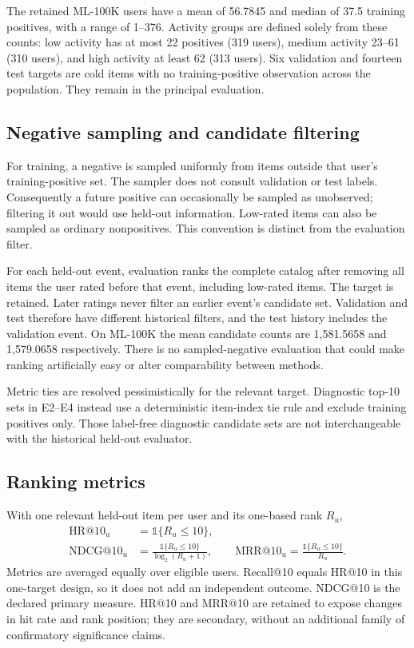 The retained ML-100K users have a mean of 56.7845 and median of 37.5 training
positives, with a range of 1--376. Activity groups are defined solely from these
counts: low activity has at most 22 positives (319 users), medium activity
23--61 (310 users), and high activity at least 62 (313 users). Six validation
and fourteen test targets are cold items with no training-positive observation
across the population. They remain in the principal evaluation.

\subsection{Negative sampling and candidate filtering}
For training, a negative is sampled uniformly from items outside that user's
training-positive set. The sampler does not consult validation or test labels.
Consequently a future positive can occasionally be sampled as unobserved; filtering
it out would use held-out information. Low-rated items can also be sampled as
ordinary nonpositives. This convention is distinct from the evaluation filter.

For each held-out event, evaluation ranks the complete catalog after removing
all items the user rated before that event, including low-rated items. The
target is retained. Later ratings never filter an earlier event's candidate
set. Validation and test therefore have different historical filters, and
the test history includes the validation event. On ML-100K the mean candidate
counts are 1,581.5658 and 1,579.0658 respectively. There is no sampled-negative
evaluation that could make ranking artificially easy or alter comparability
between methods.

Metric ties are resolved pessimistically for the relevant target. Diagnostic
top-10 sets in E2--E4 instead use a deterministic item-index tie rule and exclude
training positives only. Those label-free diagnostic candidate sets are not
interchangeable with the historical held-out evaluator.

\subsection{Ranking metrics}
With one relevant held-out item per user and its one-based rank $R_u$,
\begin{align}
 \mathrm{HR@10}_u&=\mathbb{1}\{R_u\leq10\},\nonumber\\
 \mathrm{NDCG@10}_u&=\frac{\mathbb{1}\{R_u\leq10\}}{\log_2(R_u+1)},\qquad
 \mathrm{MRR@10}_u=\frac{\mathbb{1}\{R_u\leq10\}}{R_u}.
 \label{eq:metrics}
\end{align}
Metrics are averaged equally over eligible users. Recall@10 equals HR@10 in
this one-target design, so it does not add an independent outcome. NDCG@10 is
the declared primary measure. HR@10 and MRR@10 are retained to expose changes
in hit rate and rank position; they are secondary, without an additional
family of confirmatory significance claims.

